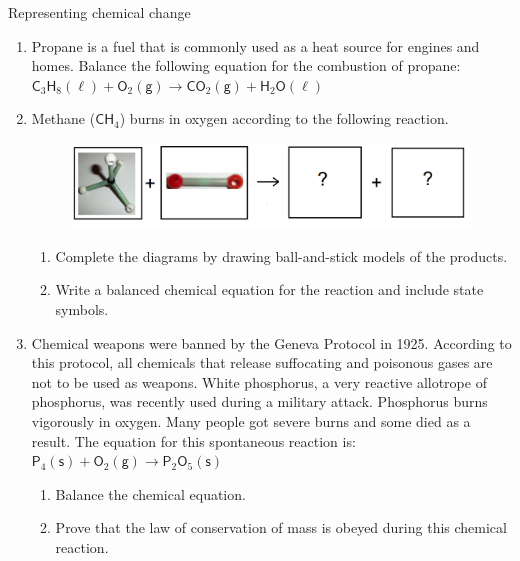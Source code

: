             \begin{eocexercises}{Representing chemical change}
            \nopagebreak
      \label{m38727*id67334}\begin{enumerate}[noitemsep, label=\textbf{\arabic*}. ] 
\label{m38727*uid45}\item Propane is a fuel that is commonly used as a heat source for engines and homes. Balance the following equation for the combustion of propane:
${\mathsf{C}}_{3}{\mathsf{H}}_{8} \mathsf{(\ell)} + \mathsf{O}_{2} \mathsf{(g)} \to \mathsf{CO}_{2} \mathsf{(g)} + \mathsf{H}_{2}\mathsf{O} \mathsf{(\ell)}$
        \label{m38727*uid47}\item Methane ($\mathsf{CH}_{4}$) burns in oxygen according to the following reaction. \\
\begin{figure}
 \includegraphics[width=.8\textwidth]{photos/methane_O2_rxn.png}
\end{figure}
\begin{enumerate}[noitemsep, label=\textbf{\alph*}.]
 \item Complete the diagrams by drawing ball-and-stick models of the products.
\item Write a balanced chemical equation for the reaction and include state symbols.
\end{enumerate}
 \label{m38727*uid48}\item Chemical weapons were banned by the Geneva Protocol in 1925. According to this protocol, all chemicals that release suffocating and poisonous gases are not to be used as weapons. White phosphorus, a very reactive allotrope of phosphorus, was recently used during a military attack. Phosphorus burns vigorously in oxygen. Many people got severe burns and some died as a result. The equation for this spontaneous reaction is:
        ${\mathsf{P}}_{4}\left(\mathsf{s}\right)+{\mathsf{O}}_{2}\left(\mathsf{g}\right)\to {\mathsf{P}}_{2}{\mathsf{O}}_{5}\left(\mathsf{s}\right)$\label{m38727*id67821}\begin{enumerate}[noitemsep, label=\textbf{\alph*}. ] 
            \label{m38727*uid49}\item Balance the chemical equation.
\label{m38727*uid50}\item Prove that the law of conservation of mass is obeyed during this chemical reaction.

\end{enumerate}
\end{enumerate}
\end{eocexercises}
